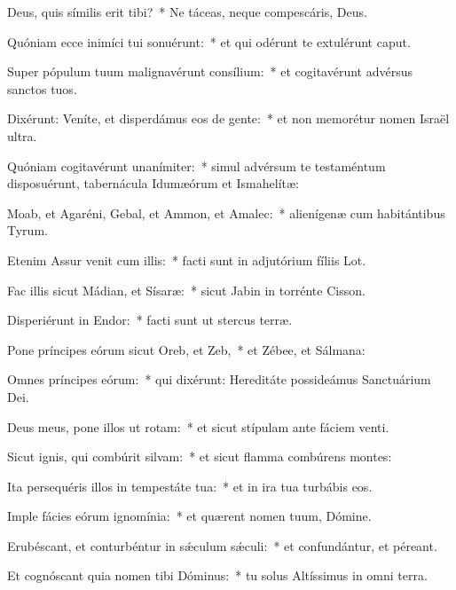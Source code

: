 \item Deus, quis símilis erit tibi?~* Ne táceas, neque compescáris, Deus.

\item Quóniam ecce inimíci tui sonuérunt:~* et qui odérunt te extulérunt caput.

\item Super pópulum tuum malignavérunt consílium:~* et cogitavérunt advérsus sanctos tuos.

\item Dixérunt: Veníte, et disperdámus eos de gente:~* et non memorétur nomen Israël ultra.

\item Quóniam cogitavérunt unanímiter:~* simul advérsum te testaméntum disposuérunt, tabernácula Idumæórum et Ismahelítæ:

\item Moab, et Agaréni, Gebal, et Ammon, et Amalec:~* alienígenæ cum habitántibus Tyrum.

\item Etenim Assur venit cum illis:~* facti sunt in adjutórium fíliis Lot.

\item Fac illis sicut Mádian, et Sísaræ:~* sicut Jabin in torrénte Cisson.

\item Disperiérunt in Endor:~* facti sunt ut stercus terræ.

\item Pone príncipes eórum sicut Oreb, et Zeb,~* et Zébee, et Sálmana:

\item Omnes príncipes eórum:~* qui dixérunt: Hereditáte possideámus Sanctuárium Dei.

\item Deus meus, pone illos ut rotam:~* et sicut stípulam ante fáciem venti.

\item Sicut ignis, qui combúrit silvam:~* et sicut flamma combúrens montes:

\item Ita persequéris illos in tempestáte tua:~* et in ira tua turbábis eos.

\item Imple fácies eórum ignomínia:~* et quærent nomen tuum, Dómine.

\item Erubéscant, et conturbéntur in sǽculum sǽculi:~* et confundántur, et péreant.

\item Et cognóscant quia nomen tibi Dóminus:~* tu solus Altíssimus in omni terra.